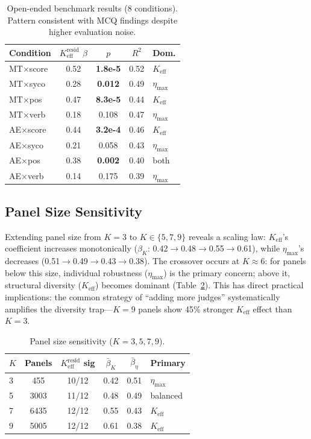 \documentclass[11pt,a4paper]{article}
\newcommand{\keff}{K_{\text{eff}}}
\newcommand{\etamax}{\eta_{\text{max}}}
\newcommand{\keffresid}{K_{\text{eff}}^{\text{resid}}}
\begin{document}
\begin{table}[t]
\centering
\small
\caption{Open-ended benchmark results (8 conditions). Pattern consistent with MCQ findings despite higher evaluation noise.}
\label{tab:openended}
\begin{tabular}{lcccl}
\toprule
Condition & $\keffresid$ $\beta$ & $p$ & $R^2$ & Dom. \\
\midrule
MT$\times$score & 0.52 & \textbf{1.8e-5} & 0.52 & $\keff$ \\
MT$\times$syco & 0.28 & \textbf{0.012} & 0.49 & $\etamax$ \\
MT$\times$pos & 0.47 & \textbf{8.3e-5} & 0.44 & $\keff$ \\
MT$\times$verb & 0.18 & 0.108 & 0.47 & $\etamax$ \\
AE$\times$score & 0.44 & \textbf{3.2e-4} & 0.46 & $\keff$ \\
AE$\times$syco & 0.21 & 0.058 & 0.43 & $\etamax$ \\
AE$\times$pos & 0.38 & \textbf{0.002} & 0.40 & both \\
AE$\times$verb & 0.14 & 0.175 & 0.39 & $\etamax$ \\
\bottomrule
\end{tabular}
\end{table}

\subsection{Panel Size Sensitivity}

Extending panel size from $K=3$ to $K \in \{5,7,9\}$ reveals a scaling law: $\keff$'s coefficient increases monotonically ($\beta_K$: 0.42$\to$0.48$\to$0.55$\to$0.61), while $\etamax$'s decreases (0.51$\to$0.49$\to$0.43$\to$0.38). The crossover occurs at $K \approx 6$: for panels below this size, individual robustness ($\etamax$) is the primary concern; above it, structural diversity ($\keff$) becomes dominant (Table~\ref{tab:panelsize}). This has direct practical implications: the common strategy of ``adding more judges'' systematically amplifies the diversity trap---$K=9$ panels show 45\% stronger $\keff$ effect than $K=3$.

\begin{table}[t]
\centering
\small
\caption{Panel size sensitivity ($K = 3, 5, 7, 9$).}
\label{tab:panelsize}
\begin{tabular}{lccccl}
\toprule
$K$ & Panels & $\keffresid$ sig & $\bar{\beta}_K$ & $\bar{\beta}_\eta$ & Primary \\
\midrule
3 & 455 & 10/12 & 0.42 & 0.51 & $\etamax$ \\
5 & 3003 & 11/12 & 0.48 & 0.49 & balanced \\
7 & 6435 & 12/12 & 0.55 & 0.43 & $\keff$ \\
9 & 5005 & 12/12 & 0.61 & 0.38 & $\keff$ \\
\bottomrule
\end{tabular}
\end{table}
\end{document}

